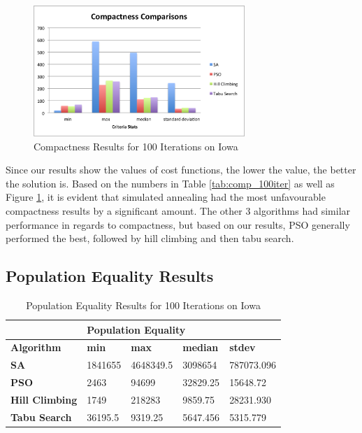 \documentclass[journal]{IEEEtran}
\begin{document}
\begin{figure}[h!]
    \includegraphics[width=8cm]{images/compactness_graph.png}
    \centering
    \caption{Compactness Results for 100 Iterations on Iowa}
    \label{fig:compactness_results}
\end{figure}

Since our results show the values of cost functions, the lower the value, the better the solution is. Based on the numbers in Table \ref{tab:comp_100iter} as well as Figure \ref{fig:compactness_results}, it is evident that simulated annealing had the most unfavourable compactness results by a significant amount. The other 3 algorithms had similar performance in regards to compactness, but based on our results, PSO generally performed the best, followed by hill climbing and then tabu search. 

\subsection{Population Equality Results}

\begin{table}[!h]
\centering
\caption{Population Equality Results for 100 Iterations on Iowa}
\label{tab:pop_100iter}
\begin{tabular}{l|llll}
                       & \multicolumn{4}{l}{\textbf{Population Equality}}             \\ \hline
\textbf{Algorithm}     & \textbf{min} & \textbf{max} & \textbf{median} & \textbf{stdev} \\ \hline
\textbf{SA}            & 1841655      & 4648349.5    & 3098654         & 787073.096         \\
\textbf{PSO}           & 2463         & 94699        & 32829.25        & 15648.72           \\
\textbf{Hill Climbing} & 1749         & 218283       & 9859.75         & 28231.930        \\
\textbf{Tabu Search}   & 36195.5      & 9319.25         & 5647.456       & 5315.779     
\end{tabular}
\end{table}
\end{document}
